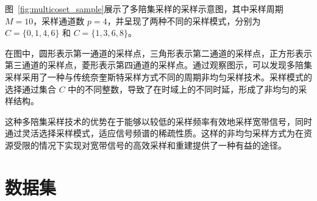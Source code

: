 图~\ref{fig:multicoset_sample}展示了多陪集采样的采样示意图，其中采样周期 \(M = 10\)，采样通道数 \(p = 4\)，并呈现了两种不同的采样模式，分别为 \(C = \{0,1,4,6\}\) 和 \(C = \{1,3,6,8\}\)。

在图中，圆形表示第一通道的采样点，三角形表示第二通道的采样点，正方形表示第三通道的采样点，菱形表示第四通道的采样点。通过观察图示，可以发现多陪集采样采用了一种与传统奈奎斯特采样方式不同的周期非均匀采样技术。采样模式的选择通过集合 \(C\) 中的不同整数，导致了在时域上的不同时延，形成了非均匀的采样结构。

这种多陪集采样技术的优势在于能够以较低的采样频率有效地采样宽带信号，同时通过灵活选择采样模式，适应信号频谱的稀疏性质。这样的非均匀采样方式为在资源受限的情况下实现对宽带信号的高效采样和重建提供了一种有益的途径。

\section{数据集}\label{sec:background}

